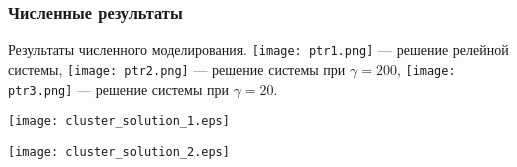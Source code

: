 \begin{frame}
	\frametitle{Численные результаты}
	
	Результаты численного моделирования.
	\texttt{[image: ptr1.png]} --- решение релейной системы, \texttt{[image: ptr2.png]}  --- решение системы при $\gamma = 200$, \texttt{[image: ptr3.png]} --- решение системы при $\gamma = 20$.
	
	\begin{center}
	\texttt{[image: cluster\_solution\_1.eps]}
	
	\smallskip
	
	\texttt{[image: cluster\_solution\_2.eps]}
	\end{center}
\end{frame}
